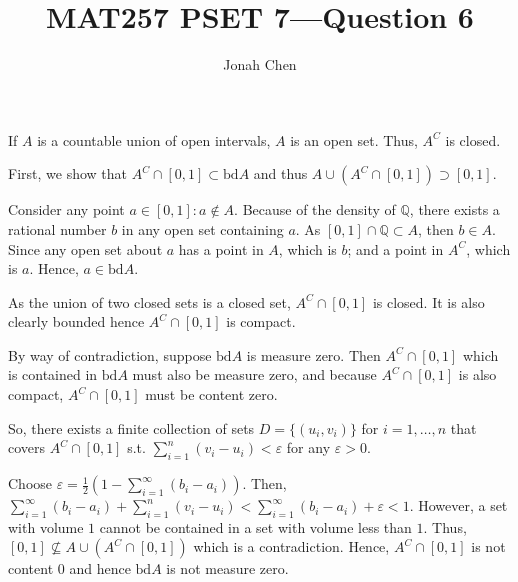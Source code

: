 \documentclass{exam}
\title{MAT257 PSET 7---Question 6}
\author{Jonah Chen}
\numberwithin{equation}{section}
\begin{document}
\sffamily
\maketitle
If $A$ is a countable union of open intervals, $A$ is an open set. Thus, $A^C$ is closed. 

First, we show that $A^C\cap[0,1]\subset\mathrm{bd}A$ and thus $A\cup(A^C\cap[0,1])\supset[0,1]$. 

Consider any point $a\in[0,1]:a\notin A$. Because of the density of $\mathbb Q$, there exists a rational number $b$ in any open set containing $a$. As $[0,1]\cap\mathbb Q\subset A$, then $b\in A$. Since any open set about $a$ has a point in $A$, which is $b$; and a point in $A^C$, which is $a$. Hence, $a\in\mathrm{bd} A$.

As the union of two closed sets is a closed set, $A^C\cap[0,1]$ is closed. It is also clearly bounded hence $A^C\cap[0,1]$ is compact. 

By way of contradiction, suppose $\mathrm{bd}A$ is measure zero. Then $A^C\cap[0,1]$ which is contained in $\mathrm{bd}A$ must also be measure zero, and because $A^C\cap[0,1]$ is also compact, $A^C\cap[0,1]$ must be content zero.

So, there exists a finite collection of sets $D=\{(u_i,v_i)\}$ for $i=1,\dots,n$ that covers $A^C\cap[0,1]$ s.t. $\sum_{i=1}^n(v_i-u_i)<\varepsilon$ for any $\varepsilon>0$. 

Choose $\varepsilon=\frac{1}{2}\left(1-\sum_{i=1}^\infty(b_i-a_i)\right)$. Then, $\sum_{i=1}^\infty(b_i-a_i)+\sum_{i=1}^n(v_i-u_i)<\sum_{i=1}^\infty(b_i-a_i)+\varepsilon<1$. However, a set with volume $1$ cannot be contained in a set with volume less than $1$. Thus, $[0,1]\nsubseteq A\cup(A^C\cap[0,1])$ which is a contradiction. Hence, $A^C\cap[0,1]$ is not content 0 and hence $\mathrm{bd}A$ is not measure zero.
\end{document}
